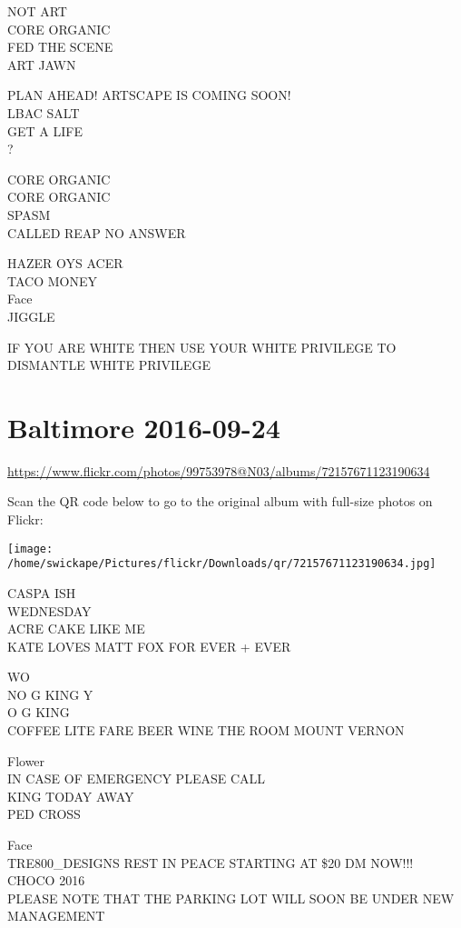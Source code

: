 \documentclass[10pt,letterpaper]{article}
\begin{document}
NOT ART\\
CORE ORGANIC\\
FED THE SCENE\\
ART JAWN

PLAN AHEAD!  ARTSCAPE IS COMING SOON!\\
LBAC SALT\\
GET A LIFE\\
?

CORE ORGANIC\\
CORE ORGANIC\\
SPASM\\
CALLED REAP NO ANSWER

HAZER OYS ACER\\
TACO MONEY\\
Face\\
JIGGLE

IF YOU ARE WHITE THEN USE YOUR WHITE PRIVILEGE TO DISMANTLE WHITE PRIVILEGE


\section*{Baltimore 2016-09-24}

\url{https://www.flickr.com/photos/99753978@N03/albums/72157671123190634}

Scan the QR code below to go to the original album with full-size photos on Flickr:

\texttt{[image: /home/swickape/Pictures/flickr/Downloads/qr/72157671123190634.jpg]}


CASPA ISH\\
WEDNESDAY\\
ACRE CAKE LIKE ME\\
KATE LOVES MATT FOX FOR EVER + EVER

WO\\
NO G KING Y\\
O G KING\\
COFFEE LITE FARE BEER WINE THE ROOM MOUNT VERNON

Flower\\
IN CASE OF EMERGENCY PLEASE CALL\\
KING TODAY AWAY\\
PED CROSS

Face\\
TRE800\_DESIGNS REST IN PEACE STARTING AT \$20 DM NOW!!!\\
CHOCO 2016\\
PLEASE NOTE THAT THE PARKING LOT WILL SOON BE UNDER NEW MANAGEMENT
\end{document}
